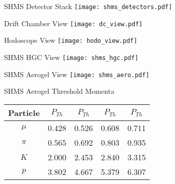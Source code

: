 \begin{Mfigure}{SHMS Detector Stack}
  \centering
  \texttt{[image: shms\_detectors.pdf]}
  \caption{Overview of SHMS Detector Stack.}
  \label{fig:2-4_shms_detectors}
\end{Mfigure}

\begin{Mfigure}{Drift Chamber View}
  \centering
  \texttt{[image: dc\_view.pdf]}
  \caption{Basic design and components of DC1 (left) and DC2 (right).}
  \label{fig:2-4_dc_view}
\end{Mfigure}

\begin{Mfigure}{Hodoscope View}
  \centering
  \texttt{[image: hodo\_view.pdf]}
  \caption{Basic design of a hodoscope pair.}
  \label{fig:2-4_hodo_view}
\end{Mfigure}

\begin{Mfigure}{SHMS HGC View}
  \centering
  \texttt{[image: shms\_hgc.pdf]}
  \caption{View of the SHMS Heavy Gas Cerenkov's four mirrors and PMTs.}
  \label{fig:2-4_shms_hgc}
\end{Mfigure}

\begin{Mfigure}{SHMS Aerogel View}
  \centering
  \texttt{[image: shms\_aero.pdf]}
  \caption{View of the SHMS aerogel Cerenkov.}
  \label{fig:2-4_shms_aero}
\end{Mfigure}

\begin{Mtable}{SHMS Aerogel Threshold Momenta}
  \centering
  \begin{tabular}{|c|c|c|c|c|}
    \hline
    \textbf{Particle} & \textbf{$P_{Th}$} & \textbf{$P_{Th}$} & \textbf{$P_{Th}$} & \textbf{$P_{Th}$} \\
    \hline
    $\mu$ & 0.428 & 0.526 & 0.608 & 0.711 \\
    $\pi$ & 0.565 & 0.692 & 0.803 & 0.935 \\
    $K$ & 2.000 & 2.453 & 2.840 & 3.315 \\
    $p$ & 3.802 & 4.667 & 5.379 & 6.307 \\
    \hline
  \end{tabular}
  \caption{Threshold momenta ($P_{Th}$ in GeV/c) for a variety of charged particles and the corresponding refractive indices.}
  \label{tab:2-4_aero_threshold}
\end{Mtable}

